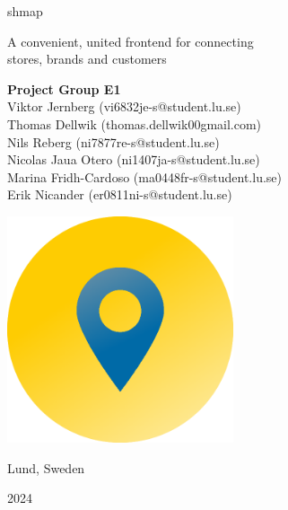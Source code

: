 \documentclass[titlepage]{article}
\def\companyName{shmap}
\begin{document}
\begin{titlepage}
    \begin{center}
        \vspace*{1.5cm}
        
        \begin{flushleft}

        {\selectfont
            {\Huge \companyName}
        }

        \vspace{0.5cm}
            {\large A convenient, united frontend for connecting\\
        stores, brands and customers}
            
        \vspace{1.25cm}
        
        \textbf{Project Group E1} \\
        {\normalsize
        Viktor Jernberg (vi6832je-s@student.lu.se)\\
        Thomas Dellwik (thomas.dellwik00gmail.com)\\
        Nils Reberg (ni7877re-s@student.lu.se)\\
        Nicolas Jaua Otero (ni1407ja-s@student.lu.se)\\
        Marina Fridh-Cardoso (ma0448fr-s@student.lu.se)\\
        Erik Nicander (er0811ni-s@student.lu.se)}
        
        \vspace{2.5cm}
        
        \hfill\includegraphics[width=0.5\textwidth]{logo_gradient.png}
       
        \vspace{1.0cm}

        {\large Lund, Sweden}

        \vspace{0.2cm}
        
        {\large 2024}
        
        \end{flushleft}
            
    \end{center}
\end{titlepage}
\end{document}
